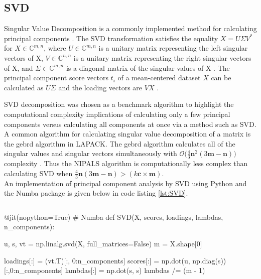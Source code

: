 \documentclass[12pt]{article}
\begin{document}
\subsection{SVD}\label{3.2}
Singular Value Decomposition is a commonly implemented method for calculating principal components \cite{oliphant2009numpy} \cite{scikit-learn}. The SVD transformation satisfies the equality $X=U \Sigma V^*$ for $X \in \mathbb{C}^{m,n}$, where
$ U\in \mathbb{C}^{m,n}$ is a unitary matrix representing the left singular vectors of X, $ V\in \mathbb{C}^{n,n}$ is a unitary matrix representing the right singular vectors of X, and $\Sigma \in \mathbb{C}^{m,n}$ is a diagonal matrix of the singular values of X \cite{trefethen1997numerical}. The principal component score vectors $t_i$ of a mean-centered dataset $X$ can be calculated as $U \Sigma $ and the loading vectors are $VX$ \cite{madsen2004singular}. 

SVD decomposition was chosen as a benchmark algorithm to highlight the computational complexity implications of calculating only a few principal components versus calculating all components at once via a method such as SVD. A common algorithm for calculating singular value decomposition of a matrix is the gebrd algorithm in LAPACK. The gebrd algorithm calculates all of the singular values and singular vectors simultaneously with $\mathcal{O}\big( \frac{4}{3}\textbf{n}^2(3\textbf{m} - \textbf{n}) \big)$ complexity \cite{intelmath}. Thus the NIPALS algorithm is computationally less complex than calculating SVD when $\frac{4}{3}\textbf{n}(3\textbf{m} - \textbf{n})>(k\textbf{c}\times\textbf{m})$.  \\ An implementation of principal component analysis by SVD using Python and the Numba package \cite{numba} is given below in code listing \ref{lst:SVD}.

\begin{lstlisting}[frame=none,caption={Calculating Principal Components with SVD},captionpos=b,label=lst:SVD]
\end{lstlisting}

\begin{python}
@jit(nopython=True) # Numba
def SVD(X, scores, loadings, lambdas, n_components):

    u, s, vt = np.linalg.svd(X, full_matrices=False)
    m = X.shape[0]

    loadings[:] = (vt.T)[:, 0:n_components]
    scores[:] = np.dot(u, np.diag(s))[:,0:n_components]
    lambdas[:] = np.dot(s, s)
    lambdas /= (m - 1)
\end{python}
\end{document}
